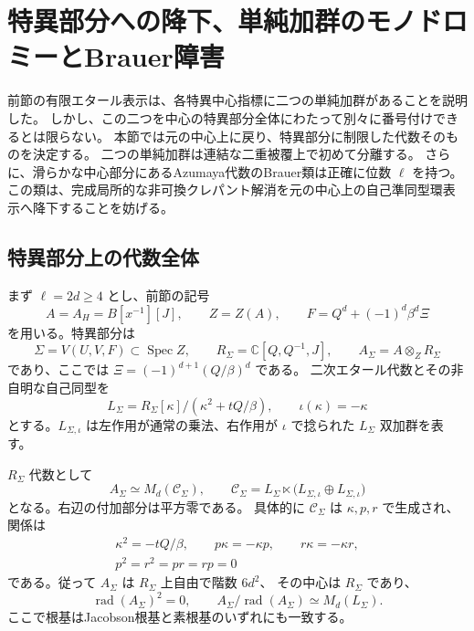 \section{特異部分への降下、単純加群のモノドロミーとBrauer障害}
\label{sec:singular-descent-v39}

前節の有限エタール表示は、各特異中心指標に二つの単純加群があることを説明した。
しかし、この二つを中心の特異部分全体にわたって別々に番号付けできるとは限らない。
本節では元の中心上に戻り、特異部分に制限した代数そのものを決定する。
二つの単純加群は連結な二重被覆上で初めて分離する。
さらに、滑らかな中心部分にあるAzumaya代数のBrauer類は正確に位数 $\ell$ を持つ。
この類は、完成局所的な非可換クレパント解消を元の中心上の自己準同型環表示へ降下することを妨げる。

\subsection{特異部分上の代数全体}

まず $\ell=2d\ge4$ とし、前節の記号
\[
 A=A_H=B[x^{-1}][J],\qquad Z=Z(A),\qquad
 F=Q^d+(-1)^d\beta^d\Xi
\]
を用いる。特異部分は
\[
 \Sigma=V(U,V,F)\subset\operatorname{Spec}Z,
 \qquad R_\Sigma=\mathbb C[Q,Q^{-1},J],
 \qquad A_\Sigma=A\otimes_ZR_\Sigma
\]
であり、ここでは $\Xi=(-1)^{d+1}(Q/\beta)^d$ である。
二次エタール代数とその非自明な自己同型を
\begin{equation}
\label{eq:singular-double-cover-v39}
 L_\Sigma=R_\Sigma[\kappa]/(\kappa^2+tQ/\beta),
 \qquad \iota(\kappa)=-\kappa
\end{equation}
とする。$L_{\Sigma,\iota}$ は左作用が通常の乗法、右作用が $\iota$ で捻られた
$L_\Sigma$ 双加群を表す。

\begin{theorem}[特異部分上の大域的な降下代数]
\label{thm:singular-descent-v39}
$R_\Sigma$ 代数として
\begin{equation}
\label{eq:singular-descent-algebra-v39}
 A_\Sigma\simeq M_d(\mathscr C_\Sigma),\qquad
 \mathscr C_\Sigma=
 L_\Sigma\ltimes
 \bigl(L_{\Sigma,\iota}\oplus L_{\Sigma,\iota}\bigr)
\end{equation}
となる。右辺の付加部分は平方零である。
具体的に $\mathscr C_\Sigma$ は $\kappa,p,r$ で生成され、関係は
\begin{equation}
\label{eq:singular-corner-relations-v39}
 \begin{gathered}
 \kappa^2=-tQ/\beta,\qquad
 p\kappa=-\kappa p,\qquad r\kappa=-\kappa r,\\
 p^2=r^2=pr=rp=0
 \end{gathered}
\end{equation}
である。従って $A_\Sigma$ は $R_\Sigma$ 上自由で階数 $6d^2$、
その中心は $R_\Sigma$ であり、
\[
 \operatorname{rad}(A_\Sigma)^2=0,
 \qquad
 A_\Sigma/\operatorname{rad}(A_\Sigma)\simeq M_d(L_\Sigma).
\]
ここで根基はJacobson根基と素根基のいずれにも一致する。
\end{theorem}

